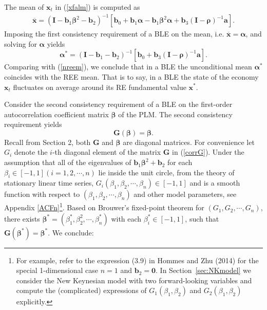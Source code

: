 The mean of $\pmb x_t$ in
(\ref{xfalm}) is computed as
\begin{eqnarray}\label{xfmn}
\overline {\pmb x}=(\pmb I-{\pmb b}_1{\pmb\beta}^2-{\pmb b}_2)^{-1}[ {\pmb b}_0+{\pmb b}_1\pmb\alpha-{\pmb b}_1\pmb\beta^2\pmb\alpha+{\pmb b}_3
(\pmb I-\pmb \rho)^{-1}\pmb a].
\end{eqnarray}
Imposing the first consistency requirement of a BLE on the mean,
i.e. $\overline {\pmb x}=\pmb\alpha$, and solving for $\pmb\alpha$ yields
\begin{equation}\label{sceex}
\pmb\alpha^*=({\pmb I}-{\pmb b}_1-{\pmb b}_2)^{-1}[{\pmb b}_0+{\pmb b}_3({\pmb I}-{\pmb\rho})^{-1}{\pmb a}].
\end{equation}
Comparing with (\ref{nreem}), we conclude that in a BLE the
unconditional mean $\pmb\alpha^*$  coincides with the REE mean. That is
to say, in a BLE the state of the economy ${\pmb x}_t$ fluctuates on
average around its RE fundamental value ${\pmb x}^*$.

Consider the second consistency requirement of a BLE on the first-order autocorrelation coefficient matrix $\pmb\beta$ of the PLM. The second consistency requirement yields
\begin{equation}
\label{betacons} {\pmb G}({\pmb{\beta}})={\pmb{\beta}}.
\end{equation}
Recall from Section 2, both $\pmb G$ and $\pmb\beta$ are diagonal matrices. For convenience let $G_i$ denote the $i$-th diagonal element of the matrix $\pmb G$ in (\ref{corrG}). Under the assumption that all of the eigenvalues of ${\pmb b}_1{\pmb\beta}^2+{\pmb b}_2$ for each $\beta_i\in[-1,1] (i=1,2,\cdots,n)$ lie inside the unit circle, from the theory of stationary linear time series, $G_i(\beta_1,\beta_2,\cdots,\beta_n)\in[-1,1]$ and is a smooth function with respect to $(\beta_1,\beta_2,\cdots,\beta_n)$ and other model parameters, see Appendix \ref{ACFn}\footnote{For example, refer to the expression (3.9) in Hommes and Zhu (2014) for the special 1-dimensional case $n=1$ and ${\pmb b}_2={\pmb 0}$. In Section~\ref{sec:NKmodel} we consider the New Keynesian model with two forward-looking variables and compute the (complicated) expressions of $G_1(\beta_1,\beta_2)$ and $G_2(\beta_1,\beta_2)$ explicitly.}. Based on Brouwer's fixed-point theorem for $(G_1, G_2, \cdots,G_n)$,
there exists ${\pmb \beta}^*=(\beta_1^*, \beta_2^2,\cdots, \beta_n^*)$ with each $\beta_i^*\in[-1,1]$, such that ${\pmb G}({\pmb{\beta^{*}}})={\pmb{\beta^{*}}}$. We conclude:


